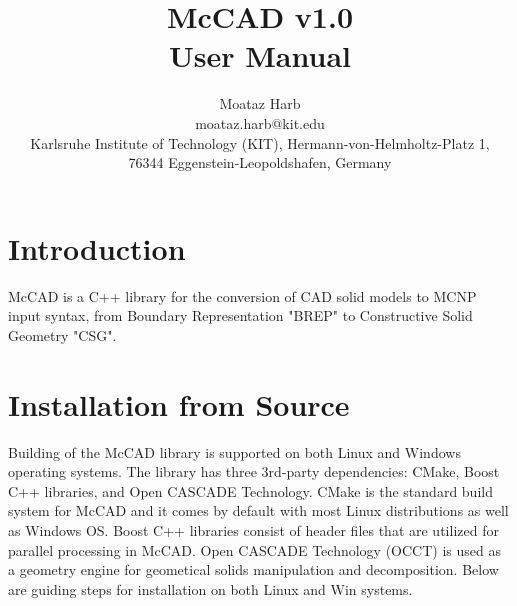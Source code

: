 \documentclass[letterpaper, 10 pt]{report}
\begin{document}
\title{McCAD v1.0 \\ User Manual}
\author{Moataz Harb \\ moataz.harb@kit.edu \\ Karlsruhe Institute of Technology (KIT), Hermann-von-Helmholtz-Platz 1, \\ 76344 Eggenstein-Leopoldshafen, Germany}
\maketitle
\pagestyle{empty}

\tableofcontents
\newpage

\section{Introduction}
McCAD is a C++ library for the conversion of CAD solid models to MCNP input syntax, from Boundary Representation "BREP" to Constructive Solid Geometry "CSG".

\section{Installation from Source}
Building of the McCAD library is supported on both Linux and Windows operating systems. The library has three 3rd-party dependencies: CMake, Boost C++ libraries, and Open CASCADE Technology. CMake is the standard build system for McCAD and it comes by default with most Linux distributions as well as Windows OS. Boost C++ libraries consist of header files that are utilized for parallel processing in McCAD. Open CASCADE Technology (OCCT) is used as a geometry engine for geometical solids manipulation and decomposition. Below are guiding steps for installation on both Linux and Win systems. 
\end{document}
